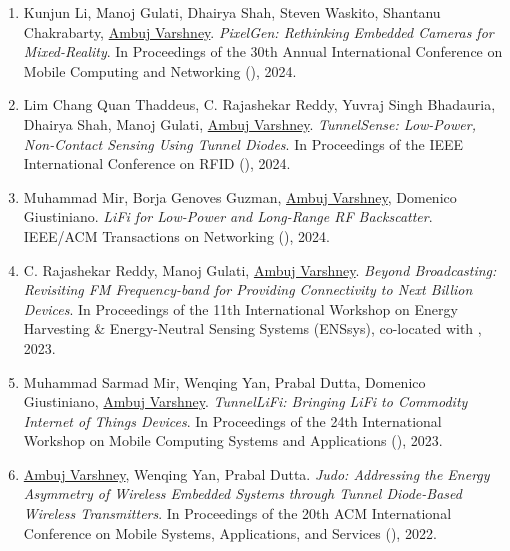 \begin{enumerate}

\item Kunjun Li\ug, Manoj Gulati\postdoc, Dhairya Shah\phd, Steven Waskito\ug, Shantanu Chakrabarty, \underline{Ambuj Varshney}.
\emph{PixelGen: Rethinking Embedded Cameras for Mixed-Reality}.
In Proceedings of the 30th Annual International Conference on Mobile Computing and Networking (), 2024.

\item Lim Chang Quan Thaddeus\ug, C. Rajashekar Reddy\phd, Yuvraj Singh Bhadauria\ug, Dhairya Shah\phd, Manoj Gulati\postdoc, \underline{Ambuj Varshney}.
\emph{TunnelSense: Low-Power, Non-Contact Sensing Using Tunnel Diodes}.
In Proceedings of the IEEE International Conference on RFID (), 2024.

\item Muhammad  Mir, Borja Genoves Guzman, \underline{Ambuj Varshney}, Domenico Giustiniano. 
\emph{LiFi for Low-Power and Long-Range RF Backscatter}. 
IEEE/ACM Transactions on Networking (), 2024.


\item C. Rajashekar Reddy\phd, Manoj Gulati\postdoc, \underline{Ambuj Varshney}.
\emph{Beyond Broadcasting: Revisiting FM Frequency-band for Providing Connectivity to Next Billion Devices}.
In Proceedings of the 11th International Workshop on Energy Harvesting \& Energy-Neutral Sensing Systems (ENSsys), co-located with , 2023.

\item Muhammad Sarmad Mir, Wenqing Yan\phd, Prabal Dutta, Domenico Giustiniano, \underline{Ambuj Varshney}.
\emph{TunnelLiFi: Bringing LiFi to Commodity Internet of Things Devices}.
In Proceedings of the 24th International Workshop on Mobile Computing Systems and Applications (), 2023.


\item \underline{Ambuj Varshney}, Wenqing Yan\phd, Prabal Dutta.
\emph{Judo: Addressing the Energy Asymmetry of Wireless Embedded Systems through Tunnel Diode-Based Wireless Transmitters}.
In Proceedings of the 20th ACM International Conference on Mobile Systems, Applications, and Services (), 2022.


\end{enumerate}

